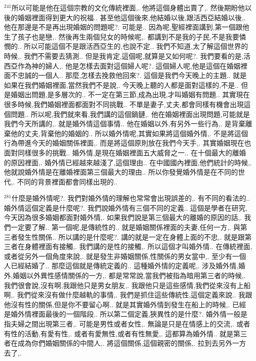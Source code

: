 \documentclass{book}
\begin{document}
$^{241}$所以可能是他在這個宗教的文化傳統裡面,.
他將這個身體出賣了,.
然後期盼他以後的婚姻裡面得到更大的祝福..
甚至他這個後來,他結婚以後,跟活西亞結婚以後,.
他在那邊是不是再出現婚姻的問題呢?.
可能是..
因為呢,聖經裡面講到,第一個跟他生了孩子也是戀,.
然後再生兩個兒女的時候呢,.
都講到不是我的子民,不是我要憐憫的..
所以可能這個不是跟活西亞生的,也說不定..
我們不知道,太了解這個世界的時候,.
我們不需要去猜測..
但是我肯定,這個呢,就算是又如何呢?.
我們要看的是,活西亞作為神的婦人,.
他是怎樣去面對這個婦人呢?.
這個婦人呢,他是這個在婚姻裡面不忠誠的一個人..
那麼,怎樣去挽救他回來?.
這個是我們今天晚上的主題..
就是如果在我們婚姻裡面,當然我們不是說,.
今天晚上聽的人都是面對這樣的,不是..
但是婚姻出問題,是多層次的..
不一定在第三節,成為出現,才叫婚姻有問題..
其實現在很多時候,我們婚姻裡面都面對不同挑戰..
不單是妻子,丈夫,都會同樣有機會出現這個問題..
所以呢,我們就來看,我們講的這個鍋鏈,.
他在婚姻裡面出現問題,可能就是我們今天所講的,.
就是婚外情這個事情..
他在婚姻以外,有另外一些行為,.
是背棄離棄他的丈夫,背棄他的婚姻的..
所以婚外情呢,其實如果將這個婚外情,.
不是將這個行為帶進今天的婚姻關係裡面,.
而是將這個原則放在我們今天手,.
其實婚姻現在也面對同樣很多的挑戰..
婚外情,是現在婚姻裡面五大威脅之一..
在十個最大的離婚的原因裡面,.
婚外情已經越來越淺了,這個理由..
在中國國內裡面,他們統計的時候,.
他就說婚外情是在離婚裡面第三個最大的理由..
所以你發覺婚外情是在不同的世代,.
不同的背景裡面都會同樣出現的..

$^{281}$什麼是婚外情呢?.
我們對婚外情的理解也常常會出現誤差的,.
有不同的看法的..
婚外情這個定義是什麼呢?.
我們說婚外情有三個不同的定義..
這個是學者在研究,今天因為很多婚姻都面對婚外情,.
如果我們說是第三個最大的離婚的原因的話,.
我們一定要了解..
第一個呢,是傳統性的..
就是婚姻關係裡面的夫妻,任何一方,.
與第三者發生性關係..
所以講的是什麼呢?.
講的就是一定在身體上面的不忠,.
就是跟第三者在身體裡面有接觸,.
我們講的是性的接觸,.
所以這個才叫婚外情..
在傳統裡面,或者從另外一個角度來說,.
就是發生非婚姻關係,性關係的男女當中,.
至少有一個人已經結婚了..
那麼這個就是傳統定義的..
這種婚外情的定義呢,.
涉及婚外情,婚外,婚姻以外異性感情關係的一方,.
都是常常說,當我們被指為暗用第三者的時候,.
我們很會說,沒有啊,我跟他只是男女朋友,.
我跟他只是這些感情,我們從來沒有上船啊,.
我們從來沒有做什麼越軌的事情,.
我們是抓住這些傳統性,這個定義來說..
我跟他沒有性的關係,但是你不要留心啊..
就是其實婚外情到發生在船上的時候,.
已經是婚外情裡面最後的一個階段..
所以第二個定義,狹異性的是什麼?.
婚外情一般是指夫婦之間出現第三者,.
可能是男性或者女性,.
無論是只是在情感上的交流,.
或者有性的活動,有愛有性,.
或者有愛無性,或者有性無愛,.
這都算為婚外情..
就是第三者在成為你們婚姻關係的中間人,.
將這個關係,這個親密的關係,.
拉到去另外一方去了,.
\end{document}
